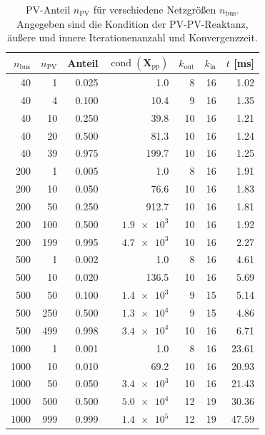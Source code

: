\begin{table}[htbp]
	\caption{PV-Anteil $n_{\mathrm{PV}}$ für verschiedene Netzgrößen $n_{\mathrm{bus}}$. Angegeben sind die Kondition der PV-PV-Reaktanz, äußere und innere Iterationenanzahl und Konvergenzzeit.}
	\label{tab:pv_share_coupled}
	\centering
	\begin{tabular}{r|r|r|r|r|r|r}
		\toprule
		$n_{\mathrm{bus}}$ & $n_{\mathrm{PV}}$ & Anteil & $\operatorname{cond}(\mathbf{X}_{\mathrm{pp}})$ & $k_{\mathrm{out}}$ & $k_{\mathrm{in}}$ & $t$ [ms] \\
		\midrule
		40 &   1 & 0.025 &   1.0 &  8 & 16 &  1.02 \\
		40 &   4 & 0.100 &  10.4  &  9 & 16 &  1.35 \\
		40 &  10 & 0.250 &  39.8  & 10 & 16 &  1.21 \\
		40 &  20 & 0.500 &  81.3  & 10 & 16 &  1.24 \\
		40 &  39 & 0.975 & 199.7  & 10 & 16 &  1.25 \\
		\midrule
		200 &   1 & 0.005 &   1.0  &  8 & 16 &  1.91 \\
		200 &  10 & 0.050 &  76.6  & 10 & 16 &  1.83 \\
		200 &  50 & 0.250 & 912.7 &   10 & 16 &  1.81 \\
		200 & 100 & 0.500 & $\num{1.9e3}$ &   10 & 16 &  1.92 \\
		200 & 199 & 0.995 & $\num{4.7e3}$ &   10 & 16 &  2.27 \\
		\midrule
		500 &   1 & 0.002 &   1.0 &     8 & 16 &  4.61 \\
		500 &  10 & 0.020 & 136.5 &    10 & 16 &  5.69 \\
		500 &  50 & 0.100 & $\num{1.4e3}$ &     9 & 15 &  5.14 \\
		500 & 250 & 0.500 & $\num{1.3e4}$ &    9 & 15 &  4.86 \\
		500 & 499 & 0.998 & $\num{3.4e4}$ &   10 & 16 &  6.71 \\
		\midrule
		1000 &   1 & 0.001 &   1.0 &    8 & 16 & 23.61 \\
		1000 &  10 & 0.010 &  69.2 &    10 & 16 & 20.93 \\
		1000 &  50 & 0.050 & $\num{3.4e3}$ &    10 & 16 & 21.43 \\
		1000 & 500 & 0.500 & $\num{5.0e4}$ &   12 & 19 & 30.36 \\
		1000 & 999 & 0.999 & $\num{1.4e5}$ &  12 & 19 & 47.59 \\
		\bottomrule
	\end{tabular}
	
\end{table}

